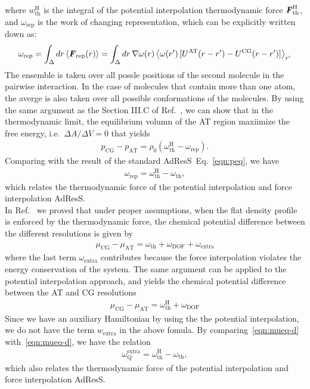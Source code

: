 \documentclass[a4paper,preprint,unsortedaddress]{revtex4-1}
\newcommand{\vect}[1]{\textbf{\textit{#1}}}
\newcommand{\dof}{{\textrm{DOF}}}
\newcommand{\AT}{{\textrm{{AT}}}}
\newcommand{\CG}{{\textrm{CG}}}
\newcommand{\HY}{{\Delta}}
\newcommand{\thf}{{\textrm{th}}}
\newcommand{\res}{{\textrm{rep}}}
\newcommand{\ext}{{\textrm{extra}}}
\newcommand{\thermo}{{\textrm{Q}}}
\newcommand{\hadress}{{\textrm{H}}}
\begin{document}
where $w_\thf^\hadress$ is the integral of the potential interpolation
thermodynamic force $\vect F_\thf^\hadress$, and
$ \omega_\res$ is the work of changing representation,
which can be explicitly written down as:
\begin{align}\label{eqn:w-rep}
  \omega_\res
  = \int_\HY d r\,\langle \vect F_\res (r)\rangle
  = \int_\HY d r\,\nabla\omega(r)\,
  \big\langle \omega(r')\, [U^\AT(r-r') - U^\CG(r-r')]\big\rangle_{r'}
\end{align}
The ensemble is taken over all possle positions of the second molecule
in the pairwise interaction. In the case of molecules that contain
more than one atom, the averge is also taken over all possible
conformations of the molecules. 
By using the same argument as the Section III.C of Ref.~\cite{prx}, we can
show that in the thermodynamic limit, the equilibrium volumn of the AT region maxiimize the
free energy, i.e.~$\Delta A / \Delta V
= 0$ that yields
\begin{align}\label{eqn:peq-h}
  p_\CG - p_\AT =  \rho_0 (\omega_\thf^\hadress - \omega_\res).
\end{align}
Comparing with the result of the standard AdResS~Eq.~\eqref{eqn:peq},
we have 
\begin{align}\label{eqn:hd-rel}
  \omega_\res = \omega_\thf^\hadress -   \omega_\thf,
\end{align}
which relates the thermodynamic force of the potential interpolation
and force interpolation AdResS.\\


In Ref.~\cite{prx} we proved that under proper assumptions,
when the flat density profile is enforced by the thermodynamic force,
the chemical potential difference between the different resolutions
is given by
\begin{align}\label{eqn:mueq-d}
 \mu_\CG - \mu_\AT =   \omega_\thf + \omega_\dof + \omega_\ext
\end{align}
where the last term $\omega_\ext$ contributes because the
force interpolation violates the energy conservation of the system.
The same argument can be applied to the potential interpolation approach,
and yields  the chemical potential difference between the AT and CG resolutions
\begin{align}\label{eqn:mueq-h}
 \mu_\CG - \mu_\AT =   \omega^\hadress_\thf + \omega_\dof 
\end{align}
Since we have an auxiliary Hamiltonian by using the the potential
interpolation, we do not have the term $w_\ext$ in the above
fomula.
By comparing~\eqref{eqn:mueq-d} with~\eqref{eqn:mueq-d}, we have the
relation
\begin{align}\label{eqn:hd-rel-2}
  \omega_\thermo^\ext = \omega^\hadress_\thf - \omega_\thf,
\end{align}
which also relates the thermodynamic force of the potential interpolation
and force interpolation AdResS.\\
\\
\end{document}

